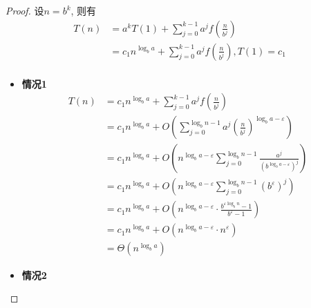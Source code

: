 \documentclass[./../main.tex]{subfiles} %
\begin{document}
\begin{proof}
    设$n=b^k$, 则有
    \begin{align*}
        T(n)&=a^kT(1)+\sum_{j=0}^{k-1}a^jf(\frac{n}{b^j})\\
        &=c_1n^{\log_ba}+\sum_{j=0}^{k-1}a^jf(\frac{n}{b^j}), T(1)=c_1\\
    \end{align*}

    \begin{itemize}
        \item \textbf{情况1}
        \begin{align*}
            T(n) &= c_{1}n^{\log_b a} + \sum_{j=0}^{k-1} a^{j}f\left(\frac{n}{b^{j}}\right) \\
            &= c_{1}n^{\log_b a} + O\left(\sum_{j=0}^{\log_b n -1} a^{j}\left(\frac{n}{b^{j}}\right)^{\log_b a - \varepsilon}\right) \\
            &= c_{1}n^{\log_b a} + O\left(n^{\log_b a - \varepsilon} \sum_{j=0}^{\log_b n -1} \frac{a^{j}}{(b^{\log_b a - \varepsilon})^{j}}\right) \\
            &= c_{1}n^{\log_b a} + O\left(n^{\log_b a - \varepsilon} \sum_{j=0}^{\log_b n -1} (b^{\varepsilon})^{j}\right) \\
            &= c_{1}n^{\log_b a} + O\left(n^{\log_b a - \varepsilon} \cdot \frac{b^{\varepsilon \log_b n} - 1}{b^{\varepsilon} - 1}\right) \\
            &= c_{1}n^{\log_b a} + O\left(n^{\log_b a - \varepsilon} \cdot n^{\varepsilon}\right) \\
            &= \Theta(n^{\log_b a})
        \end{align*}
        \item \textbf{情况2}


\end{itemize}
\end{proof}
\end{document}
